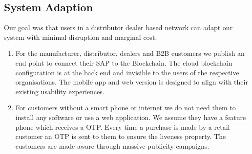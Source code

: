 \documentclass{article}
\begin{document}
\subsection{System Adaption}
Our goal was that users in a distributor dealer based network can adapt our system with minimal disruption and marginal cost. 
\begin{enumerate}
\item
For the manufacturer, distributor, dealers and B2B customers we publish an end point to connect their SAP to the Blockchain. 
The cloud blockchain configuration is at the back end and invisible to the users of the respective organisations. The mobile app and web version is designed to align with their existing usability experiences.
\item
For customers without a smart phone or internet we do not need them to install any software or use a web application. We assume they have a feature phone which receives a OTP. Every time a purchase is made by a retail customer an OTP is sent to them to ensure the liveness property. The customers are made aware through massive publicity campaigns. 
\end{enumerate}
\end{document}
